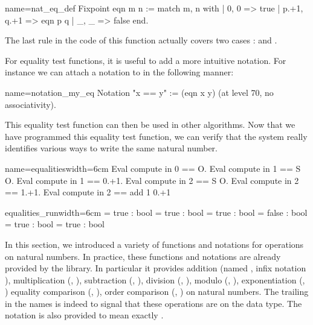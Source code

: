 \begin{coq}{name=nat_eq_def}{}
Fixpoint eqn m n :=
  match m, n with
  | 0, 0 => true
  | p.+1, q.+1 => eqn p q
  | _, _ => false
  end.
\end{coq}
The last rule in the code of this function actually covers two cases :
 and .

For equality test functions, it is useful to add a more intuitive
notation.  For instance we can attach a notation to  in
the following manner:

\begin{coq}{name=notation_my_eq}{}
Notation "x == y" := (eqn x y) (at level 70, no associativity).
\end{coq}
This equality test function can then be used in other algorithms.  Now
that we have programmed this equality test function, we can verify
that the \Coq{} system really identifies various ways to write the same
natural number.

\begin{coq}{name=equalities}{width=6cm}
Eval compute in 0 == O.
Eval compute in 1 == S O.
Eval compute in 1 == 0.+1.
Eval compute in 2 == S O.
Eval compute in 2 == 1.+1.
Eval compute in 2 == add 1 0.+1
\end{coq}
\begin{coqout}{equalities_run}{width=6cm}
= true : bool
= true : bool
= true : bool
= false : bool
= true : bool
= true : bool
\end{coqout}

In this section, we introduced a variety of functions and notations
for operations on natural numbers.  In practice, these functions and
notations are already provided by the \mcbMC{} library.  In particular
it provides addition (named , infix notation \C{+}), 
multiplication
(, \C{*}), subtraction (, \C{-}), division (,
\C{\%/}),  modulo (, \C{\%\%}), exponentiation (, \C{\^})
equality comparison (, \C{==}), order
comparison (, \C{<=}) on natural numbers.  The trailing  in
the names is indeed to signal that these operations are on the  data
type.
The notation  is also provided to mean exactly .

